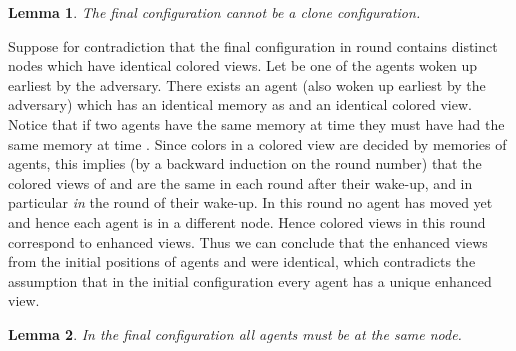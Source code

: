 \documentclass[11pt]{article}
\newtheorem{lemma}{Lemma}[section]
\newcommand{\qed}{\hfill  \bigbreak}
\newenvironment{proof}{\noindent {\bf Proof.}}{\qed}
\begin{document}
 
 \begin{lemma}\label{clone}
 The final configuration cannot be a clone configuration.
\end{lemma}

\begin{proof}
Suppose for contradiction that the final configuration in round  contains distinct nodes which have identical colored views.
Let  be one of the agents woken up earliest by the adversary. There exists an agent  (also woken up earliest by the adversary) which has an
identical memory as  and an identical colored view.
Notice that if two agents have the same memory at time  they must have had the same memory at time . Since colors in a colored view
are decided by memories of agents, this implies (by a backward induction on the round number) that the colored views of  and  are the same in each round 
after their wake-up, and in particular {\em in} the round of their wake-up. In this round no agent has moved yet and hence each agent is in a different node. Hence colored
views in this round correspond to enhanced views. Thus we can conclude that the enhanced views from the initial positions of agents  and  were identical,
which contradicts the assumption that in the initial configuration every agent has a unique enhanced view.
\end{proof}
 

  \begin{lemma}\label{one}
   In the final configuration all agents must be at the same node.
   \end{lemma}
\end{document}

